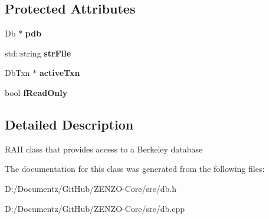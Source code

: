 \subsection*{Protected Attributes}
\begin{DoxyCompactItemize}
\item 
\mbox{\label{class_c_d_b_a4520f55d31246fc06d80f72b5dd62253}} 
Db $\ast$ {\bfseries pdb}
\item 
\mbox{\label{class_c_d_b_a15c6112d9db9dcc5f11a2c05d9aa74a5}} 
std\+::string {\bfseries str\+File}
\item 
\mbox{\label{class_c_d_b_ac06d74a2d113f593869d2f93188a0adc}} 
Db\+Txn $\ast$ {\bfseries active\+Txn}
\item 
\mbox{\label{class_c_d_b_a92ca6c13982a03afdb846588a61608fc}} 
bool {\bfseries f\+Read\+Only}
\end{DoxyCompactItemize}


\subsection{Detailed Description}
R\+A\+II class that provides access to a Berkeley database 

The documentation for this class was generated from the following files\+:\begin{DoxyCompactItemize}
\item 
D\+:/\+Documentz/\+Git\+Hub/\+Z\+E\+N\+Z\+O-\/\+Core/src/db.\+h\item 
D\+:/\+Documentz/\+Git\+Hub/\+Z\+E\+N\+Z\+O-\/\+Core/src/db.\+cpp\end{DoxyCompactItemize}

